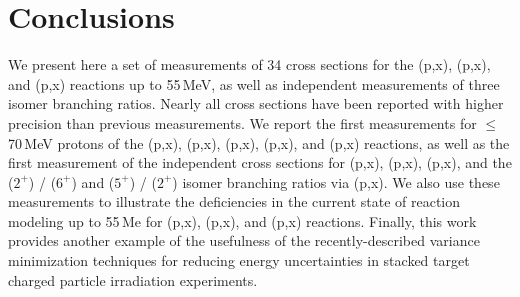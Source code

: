 % 
% 
% 





 
 \section{\label{sec:conclusions_fe}Conclusions}
 

We present here a set of measurements of 34 cross sections for the (p,x), (p,x), and  (p,x) reactions up to 55\,MeV, as well as  independent measurements of three isomer branching ratios.
Nearly all cross sections have been reported with higher precision than previous measurements.
We report the first measurements  for $\leq$70\,MeV protons  of the  (p,x), (p,x), (p,x),  (p,x), and (p,x) reactions, as well as the first measurement of the independent cross sections for    (p,x), (p,x), (p,x), and the  ($2^+$) /   ($6^+$) and  ($5^+$) /   ($2^+$)  isomer branching ratios via (p,x).
We also use these measurements to illustrate the deficiencies in the current state of  reaction modeling up to 55\,Me for  (p,x), (p,x), and  (p,x) reactions.
Finally, this work provides another example of the usefulness of the recently-described variance minimization techniques for reducing energy uncertainties in stacked target charged particle irradiation experiments.



